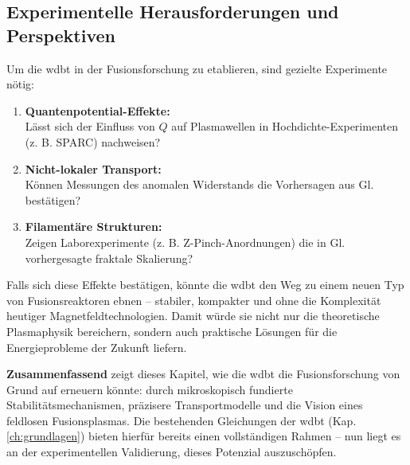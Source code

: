 \subsection{Experimentelle Herausforderungen und Perspektiven}
Um die \gls{wdbt} in der Fusionsforschung zu etablieren, sind gezielte Experimente nötig:

\begin{enumerate}
    \item \textbf{Quantenpotential-Effekte:}\\Lässt sich der Einfluss von $Q$ auf Plasmawellen in Hochdichte-Experimenten (z. B. SPARC) nachweisen?
    \item \textbf{Nicht-lokaler Transport:}\\Können Messungen des anomalen Widerstands die Vorhersagen aus Gl.  bestätigen?
    \item \textbf{Filamentäre Strukturen:}\\Zeigen Laborexperimente (z. B. Z-Pinch-Anordnungen) die in Gl.  vorhergesagte fraktale Skalierung?
\end{enumerate}

Falls sich diese Effekte bestätigen, könnte die \gls{wdbt} den Weg zu einem neuen Typ von Fusionsreaktoren ebnen – stabiler, kompakter und ohne die Komplexität heutiger
Magnetfeldtechnologien. Damit würde sie nicht nur die theoretische Plasmaphysik bereichern, sondern auch praktische Lösungen für die Energieprobleme der Zukunft liefern.

\textbf{Zusammenfassend} zeigt dieses Kapitel, wie die \gls{wdbt} die Fusionsforschung von Grund auf erneuern könnte: durch mikroskopisch fundierte Stabilitätsmechanismen, präzisere
Transportmodelle und die Vision eines feldlosen Fusionsplasmas. Die bestehenden Gleichungen der \gls{wdbt} (Kap. \ref{ch:grundlagen}) bieten hierfür bereits einen vollständigen Rahmen – nun liegt
es an der experimentellen Validierung, dieses Potenzial auszuschöpfen.
